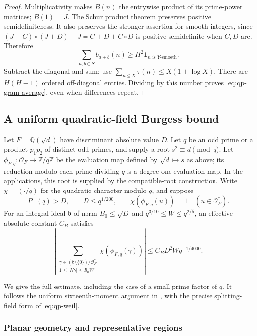 \begin{proof}
Multiplicativity makes $B(n)$ the entrywise product of its prime-power
matrices; $B(1)=J$.  The Schur product theorem preserves positive
semidefiniteness.  It also preserves the stronger assertion for smooth
integers, since
$(J+C)\circ(J+D)-J=C+D+C\circ D$ is positive semidefinite when
$C,D$ are.  Therefore
\[
 \sum_{a,b\in S}b_{a+b}(n)
 \geq H^2\mathbf1_{n\text{ is }Y\text{-smooth}}.
\]
Subtract the diagonal and sum; use
$\sum_{n\leq X}\tau(n)\leq X(1+\log X)$.
There are $H(H-1)$ ordered off-diagonal entries.  Dividing by this
number proves \eqref{eq:qp-gram-average}, even when differences repeat.
\end{proof}

\subsection{A uniform quadratic-field Burgess bound}
\label{subsec:qp-burgess}

\begin{theorem}
\label{thm:qp-burgess}
Let $F=\mathbb Q(\sqrt d)$ have discriminant absolute value $D$.
Let $q$ be an odd prime or a product $p_1p_2$ of distinct odd primes,
and supply a root $s^2\equiv d\pmod q$.  Let
$\phi_{F,q}:\mathcal O_F\longrightarrow\mathbb Z/q\mathbb Z$ be
the evaluation map defined by $\sqrt d\mapsto s$ as above; its reduction
modulo each prime dividing $q$ is a degree-one evaluation map.  In the
applications, this root is supplied by the compatible-root construction.
Write $\chi=(\cdot/q)$ for the quadratic character modulo $q$, and suppose
\[
 P^-(q)>D,\qquad D\leq q^{1/200},\qquad
 \chi(\phi_{F,q}(u))=1\quad(u\in\mathcal O_F^*).
\]
For an integral ideal $\mathfrak b$ of norm $B_0\leq\sqrt D$ and
$q^{3/10}\leq W\leq q^{2/5}$, an effective absolute constant $C_B$
satisfies
\begin{equation}
 \left|
 \sum_{\substack{\gamma\in(\mathfrak b\setminus\{0\})/\mathcal O_F^*\\
          1\leq|N\gamma|\leq B_0W}}
       \chi(\phi_{F,q}(\gamma))
 \right|
 \leq C_BD^2Wq^{-1/4000}.
 \label{eq:qp-burgess}
\end{equation}
\end{theorem}

We give the full estimate, including the case of a small prime factor
of $q$.  It follows the uniform sixteenth-moment argument in
\cite{CogDet2026}, with the precise splitting-field form of
\eqref{eq:qp-weil}.

\subsubsection{Planar geometry and representative regions}


